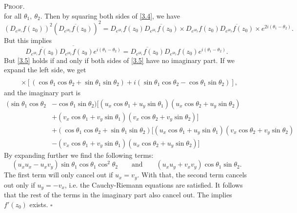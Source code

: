 \documentclass[12pt]{article}
\newcounter{ProofCounter}
\newenvironment{Proof}{\stepcounter{ProofCounter}\textsc{Proof.}}{\hfill$\square$}
\begin{document}
\begin{enumerate}[label=(\alph*),itemsep=1ex]
\begin{Proof}
\begin{equation}
\label{3.4}
\end{equation}
for all $\theta_1,\ \theta_2$. Then by squaring both sides of \eqref{3.4}, we have 
\[ (D_{e^{i\theta_1}}f(z_0))^2(\overline{D_{e^{i\theta_2}}f(z_0)})^2 = D_{e^{i\theta_1}}f(z_0)\overline{D_{e^{i\theta_1}}f(z_0)}\times D_{e^{i\theta_2}}f(z_0)
\overline{D_{e^{i\theta_2}}f(z_0)}\times e^{2i(\theta_1 - \theta_2)}. \]
But this implies 
\begin{equation}
\overline{ \overline{D_{e^{i\theta_1}}f(z_0)}D_{e^{i\theta_2}}f(z_0)e^{i(\theta_1-\theta_2)}} = 
\overline{D_{e^{i\theta_1}}f(z_0)}D_{e^{i\theta_2}}f(z_0)e^{i(\theta_1-\theta_2)}.
\label{3.5}
\end{equation}
But \eqref{3.5} holds if and only if both sides of \eqref{3.5} have no imaginary part. If we expand the left side, we get 
\begin{align*}
[(u_x\cos \theta_1 + u_y\sin\theta_1)-&i(v_x\cos\theta_1+v_y\sin\theta_1)][(u_x\cos\theta_2+u_y\sin\theta_2)+i(v_x\cos\theta_2+v_y\sin\theta_2)] \\
&\times [(\cos\theta_1\cos\theta_2 + \sin\theta_1\sin\theta_2) + i(\sin\theta_1\cos\theta_2 - \cos\theta_1\sin\theta_2)], 
\end{align*}
and the imaginary part is 
\begin{align*}
(\sin\theta_1\cos\theta_2 &- \cos\theta_1\sin\theta_2)\bigg[(u_x\cos\theta_1 + u_y\sin\theta_1)(u_x\cos\theta_2 + u_y\sin\theta_2) \\
& + (v_x\cos\theta_1 + v_y\sin\theta_1)(v_x\cos\theta_2 + v_y\sin\theta_2)\bigg] \\
& + (\cos\theta_1\cos\theta_2 + \sin\theta_1\sin\theta_2)\bigg[(u_x\cos\theta_1 + u_y\sin\theta_1)(v_x\cos\theta_2 + v_y\sin\theta_2) \\
& - (v_x\cos\theta_1 + v_y\sin\theta_1)(u_x\cos\theta_2 + u_y\sin\theta_2)\bigg]
\end{align*}
By expanding further we find the following terms:
\[ (u_xu_x - u_xv_y)\sin\theta_1\cos\theta_1\cos^2\theta_2 \qquad \text{and}\qquad (u_x u_y + v_xv_y) \cos\theta_1\sin\theta_2. \]
The first term will only cancel out if $u_x = v_y$. With that, the second term cancels out only if $u_y = -v_x$, i.e. the Cauchy-Riemann equations are satisfied. 
It follows that the rest of the terms in the imaginary part also cancel out. The implies $f'(z_0)$ exists.
\end{Proof}
\end{enumerate}


\newpage
\end{document}
